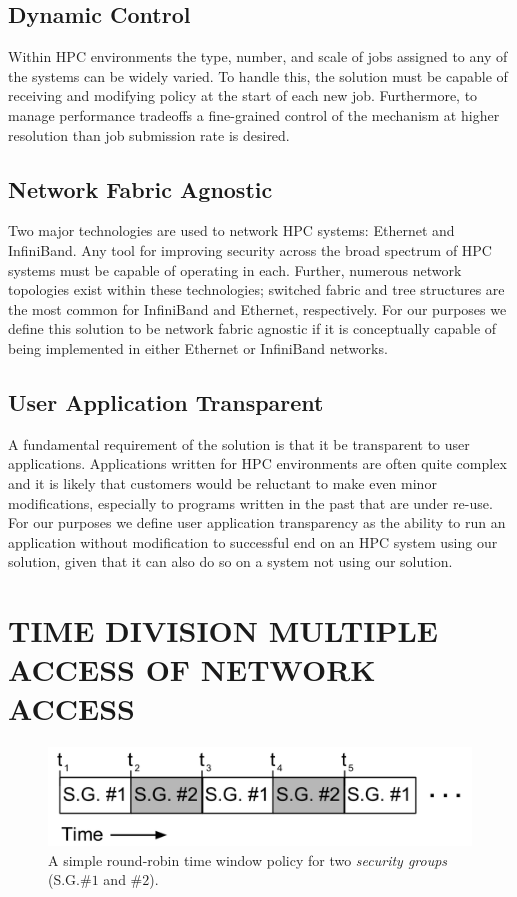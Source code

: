 \documentclass[oneside,12pt]{memoir}
\begin{document}
\section{Dynamic Control}
Within HPC environments the type, number, and scale of jobs assigned to any of the systems can be widely varied. To handle this, the solution must be capable of receiving and modifying policy at the start of each new job. Furthermore, to manage performance tradeoffs a fine-grained control of the mechanism at higher resolution than job submission rate is desired. 
\section{Network Fabric Agnostic}
Two major technologies are used to network HPC systems: Ethernet and InfiniBand. Any tool for improving security across the broad spectrum of HPC systems must be capable of operating in each. Further, numerous network topologies exist within these technologies; switched fabric and tree structures are the most common for InfiniBand and Ethernet, respectively. For our purposes we define this solution to be network fabric agnostic if it is conceptually capable of being implemented in either Ethernet or InfiniBand networks. 
\section{User Application Transparent}
A fundamental requirement of the solution is that it be transparent to user applications. Applications written for HPC environments are often quite complex and it is likely that customers would be reluctant to make even minor modifications, especially to programs written in the past that are under re-use. For our purposes we define user application transparency as the ability to run an application without modification to successful end on an HPC system using our solution, given that it can also do so on a system not using our solution. 
\chapter{TIME DIVISION MULTIPLE ACCESS OF NETWORK ACCESS}
\label{chap:tdma}
\begin{figure}
\centering
\includegraphics[scale=0.57]{network_access_slots.pdf}
\caption{A simple round-robin time window policy for two \textit{security groups} (S.G.$\#1$ and $\#2$).}
\label{fig:network_access_slots}
\end{figure}
\end{document}
